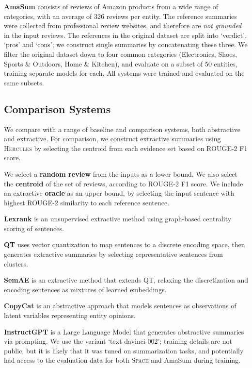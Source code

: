 \documentclass[11pt]{article}
\begin{document}
\textbf{AmaSum} \cite{brazinskas-etal-2021-learning} consists of reviews of Amazon products from a wide range of categories, with an average of 326 reviews per entity. The reference summaries were collected from professional review websites, and therefore are \emph{not grounded} in the input reviews. The references in the original dataset are split into `verdict', `pros' and `cons'; we construct single summaries by concatenating these three. We filter the original dataset down to four common categories (Electronics, Shoes, Sports \& Outdoors, Home \& Kitchen), and evaluate on a subset of 50 entities, training separate models for each. All systems were trained and evaluated on the same subsets.

\subsection{Comparison Systems}

We compare with a range of baseline and comparison systems, both abstractive and extractive. For comparison, we construct extractive summaries using \textsc{Hercules} by selecting the centroid from each evidence set based on ROUGE-2 F1 score.



We select a \textbf{random review} from the inputs as a lower bound. We also select the \textbf{centroid} of the set of reviews, according to ROUGE-2 F1 score. We include an extractive \textbf{oracle} as an upper bound, by selecting the input sentence with highest ROUGE-2 similarity to each reference sentence.

\textbf{Lexrank} \cite{lexrank} is an unsupervised extractive method using graph-based centrality scoring of sentences.

\textbf{QT} \cite{angelidis-etal-2021-extractive} uses vector quantization to map sentences to a discrete encoding space, then generates extractive summaries by selecting representative sentences from clusters.

\textbf{SemAE} \cite{basu-roy-chowdhury-etal-2022-unsupervised} is an extractive method that extends QT, relaxing the discretization and encoding sentences as mixtures of learned embeddings.


\textbf{CopyCat} \cite{brazinskas-etal-2020-unsupervised} is an abstractive approach that models sentences as observations of latent variables representing entity opinions.

\textbf{InstructGPT} \cite{instructgpt} is a Large Language Model that generates abstractive summaries via prompting. We use the variant `text-davinci-002'; training details are not public, but it is likely that it was tuned on summarization tasks, and potentially had access to the evaluation data for both \textsc{Space} and AmaSum during training.
\end{document}
